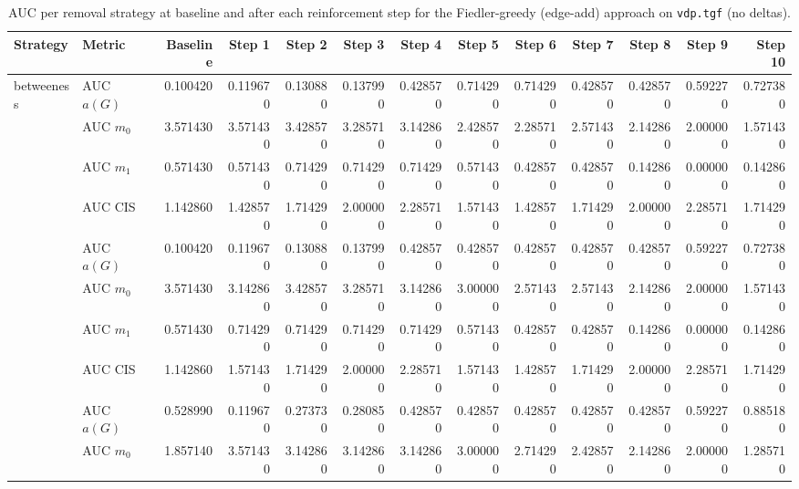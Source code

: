 \begin{table}[htbp]
  \centering
  \caption{AUC per removal strategy at baseline and after each reinforcement step for the Fiedler-greedy (edge-add) approach on \texttt{vdp.tgf} (no deltas).}
  \label{tab:vdp-fiedler_greedy-auc}
\setlength{\tabcolsep}{2.5pt}
  \begin{tabular}{llrrrrrrrrrrr}
    \toprule
    \textbf{Strategy} & \textbf{Metric} & \textbf{Baseline} & \textbf{Step 1} & \textbf{Step 2} & \textbf{Step 3} & \textbf{Step 4} & \textbf{Step 5} & \textbf{Step 6} & \textbf{Step 7} & \textbf{Step 8} & \textbf{Step 9} & \textbf{Step 10} \\
    \midrule
    \multirow{4}{*}{betweeness} & AUC $a(G)$ & 0.100420 & 0.119670 & 0.130880 & 0.137990 & 0.428570 & 0.714290 & 0.714290 & 0.428570 & 0.428570 & 0.592270 & 0.727380 \\
    & AUC $m_0$ & 3.571430 & 3.571430 & 3.428570 & 3.285710 & 3.142860 & 2.428570 & 2.285710 & 2.571430 & 2.142860 & 2.000000 & 1.571430 \\
    & AUC $m_1$ & 0.571430 & 0.571430 & 0.714290 & 0.714290 & 0.714290 & 0.571430 & 0.428570 & 0.428570 & 0.142860 & 0.000000 & 0.142860 \\
    & AUC CIS & 1.142860 & 1.428570 & 1.714290 & 2.000000 & 2.285710 & 1.571430 & 1.428570 & 1.714290 & 2.000000 & 2.285710 & 1.714290 \\
    \addlinespace
    \multirow{4}{*}{closeness} & AUC $a(G)$ & 0.100420 & 0.119670 & 0.130880 & 0.137990 & 0.428570 & 0.428570 & 0.428570 & 0.428570 & 0.428570 & 0.592270 & 0.727380 \\
    & AUC $m_0$ & 3.571430 & 3.142860 & 3.428570 & 3.285710 & 3.142860 & 3.000000 & 2.571430 & 2.571430 & 2.142860 & 2.000000 & 1.571430 \\
    & AUC $m_1$ & 0.571430 & 0.714290 & 0.714290 & 0.714290 & 0.714290 & 0.571430 & 0.428570 & 0.428570 & 0.142860 & 0.000000 & 0.142860 \\
    & AUC CIS & 1.142860 & 1.571430 & 1.714290 & 2.000000 & 2.285710 & 1.571430 & 1.428570 & 1.714290 & 2.000000 & 2.285710 & 1.714290 \\
    \addlinespace
    \multirow{4}{*}{core influence} & AUC $a(G)$ & 0.528990 & 0.119670 & 0.273730 & 0.280850 & 0.428570 & 0.428570 & 0.428570 & 0.428570 & 0.428570 & 0.592270 & 0.885180 \\
    & AUC $m_0$ & 1.857140 & 3.571430 & 3.142860 & 3.142860 & 3.142860 & 3.000000 & 2.714290 & 2.428570 & 2.142860 & 2.000000 & 1.285710 \\

\end{tabular}
\end{table}

